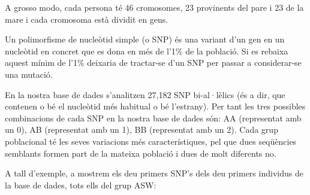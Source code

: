 \documentclass[a4paper, 11pt]{article}
\theoremstyle{definition}
\theoremstyle{remark}
\begin{document}
A grosso modo, cada persona té 46 cromosomes, 23 provinents del pare i 23 de la mare i cada cromosoma està dividit en gens.

Un polimorfisme de nucleòtid simple (o SNP) és una variant d’un gen en un nucleòtid en concret que es dona en més de l’1\% de la població. Si es rebaixa aquest mínim de l’1\% deixaria de tractar-se d’un SNP per passar a considerar-se una mutació.

En la nostra base de dades s’analitzen 27,182 SNP bi-al·lèlics (és a dir, que contenen o bé el nucleòtid més habitual o bé l’estrany). Per tant les tres possibles combinacions de cada SNP en la nostra base de dades són: AA (representat amb un 0), AB (representat amb un 1), BB (representat amb un 2). Cada grup poblacional té les seves variacions més característiques, pel que dues seqüències semblants formen part de la mateixa població i dues de molt diferents no.

A tall d’exemple, a mostrem els deu primers SNP’s dels deu primers individus de la base de dades, tots ells del grup ASW:
\end{document}
